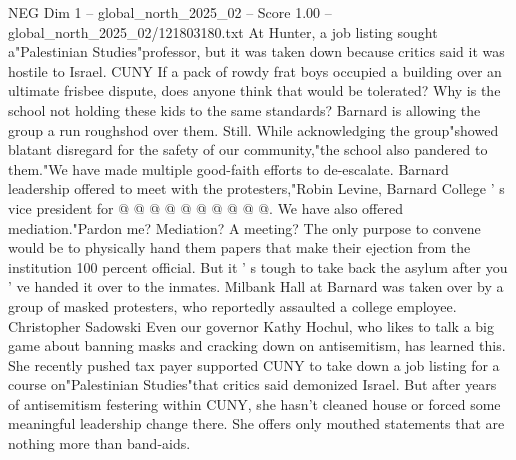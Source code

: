 \begin{textsample}{NEG Dim 1 – global\_north\_2025\_02 – Score 1.00 – global\_north\_2025\_02/121803180.txt}
At Hunter, a job listing sought a"Palestinian Studies"professor, but it was taken down because critics said it was hostile to Israel.
CUNY If a pack of rowdy frat boys occupied a building over an ultimate frisbee dispute, does anyone think that would be tolerated?
Why is the school not holding these kids to the same standards?
Barnard is allowing the group a run roughshod over them.
Still.
While acknowledging the group"showed blatant disregard for the safety of our community,"the school also pandered to them."We have made multiple good-faith efforts to de-escalate.
Barnard leadership offered to meet with the protesters,"Robin Levine, Barnard College ' s vice president for @ @ @ @ @ @ @ @ @ @.
We have also offered mediation."Pardon me?
Mediation?
A meeting?
The only purpose to convene would be to physically hand them papers that make their ejection from the institution 100 percent official.
But it ' s tough to take back the asylum after you ' ve handed it over to the inmates.
Milbank Hall at Barnard was taken over by a group of masked protesters, who reportedly assaulted a college employee.
Christopher Sadowski Even our governor Kathy Hochul, who likes to talk a big game about banning masks and cracking down on antisemitism, has learned this.
She recently pushed tax payer supported CUNY to take down a job listing for a course on"Palestinian Studies"that critics said demonized Israel.
But after years of antisemitism festering within CUNY, she hasn't cleaned house or forced some meaningful leadership change there.
She offers only mouthed statements that are nothing more than band-aids.

\end{textsample}
